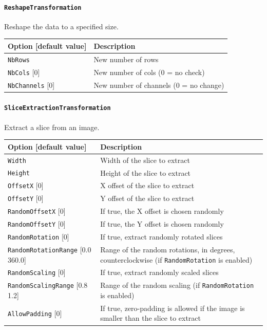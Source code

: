 \documentclass[a4paper,11pt,oneside]{article}
\newcommand{\iponly}{\reversemarginpar
    \marginnote{\color{listletiblue}\normalfont\scriptsize
    {\ttfamily{}\hyperref[sec:N2D2-IP]{\color{listletiblue}N2D2 IP}} \emph{only}}}
\begin{document}
\paragraph{\texorpdfstring{%
\lstinline[basicstyle=\ttfamily\bfseries]!ReshapeTransformation!}
{ReshapeTransformation}}
Reshape the data to a specified size.

\begin{center}
 \begin{tabular}{| p{5cm} | p{10cm} | }
 \hline
 Option [default value] & Description\\
 \hline\hline
  \cellcolor{requiredcolor}\lstinline!NbRows! & New number of rows \\
  \lstinline!NbCols! [0] & New number of cols (0 = no check) \\
  \lstinline!NbChannels! [0] & New number of channels (0 = no change) \\
 \hline
\end{tabular}
\end{center}

\paragraph{\texorpdfstring{%
\lstinline[basicstyle=\ttfamily\bfseries]!SliceExtractionTransformation!%
\protect\iponly}{SliceExtractionTransformation}}
Extract a slice from an image.

\begin{center}
 \begin{tabular}{| p{5cm} | p{10cm} | }
 \hline
 Option [default value] & Description\\
 \hline\hline
  \cellcolor{requiredcolor}\lstinline!Width! & Width of the slice to extract \\
  \cellcolor{requiredcolor}\lstinline!Height! & Height of the slice to
  extract \\
  \lstinline!OffsetX! [0] & X offset of the slice to extract \\
  \lstinline!OffsetY! [0] & Y offset of the slice to extract \\
  \lstinline!RandomOffsetX! [0] & If true, the X offset is chosen randomly \\
  \lstinline!RandomOffsetY! [0] & If true, the Y offset is chosen randomly \\
  \lstinline!RandomRotation! [0] & If true, extract randomly rotated slices \\
  \lstinline!RandomRotationRange! [0.0 360.0] & Range of the random rotations, in degrees, counterclockwise (if \lstinline!RandomRotation! is enabled) \\
  \lstinline!RandomScaling! [0] & If true, extract randomly scaled slices \\
  \lstinline!RandomScalingRange! [0.8 1.2] & Range of the random scaling (if \lstinline!RandomRotation! is enabled) \\
  \lstinline!AllowPadding! [0] & If true, zero-padding is allowed if the image
  is smaller than the slice to extract \\
 \hline
\end{tabular}
\end{center}
\end{document}
